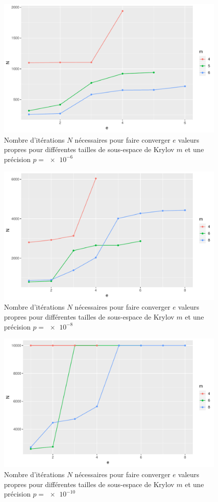 \documentclass[11pt,a4paper]{article}
\begin{document}
		\begin{figure}
			\centering
			\includegraphics[width=0.8\linewidth, keepaspectratio]{plots/Nvse-m_p6.pdf}
			\caption{Nombre d'itérations $N$ nécessaires pour faire converger $e$ valeurs propres pour différentes tailles de sous-espace de Krylov $m$ et une précision $p=\SI{e-6}{}$ \label{fig:Nvse-m_p6}}
		\end{figure}

		\begin{figure}
			\centering
			\includegraphics[width=0.8\linewidth, keepaspectratio]{plots/Nvse-m_p8.pdf}
			\caption{Nombre d'itérations $N$ nécessaires pour faire converger $e$ valeurs propres pour différentes tailles de sous-espace de Krylov $m$ et une précision $p=\SI{e-8}{}$ \label{fig:Nvse-m_p8}}
		\end{figure}

		\begin{figure}
			\centering
			\includegraphics[width=0.8\linewidth, keepaspectratio]{plots/Nvse-m_p10.pdf}
			\caption{Nombre d'itérations $N$ nécessaires pour faire converger $e$ valeurs propres pour différentes tailles de sous-espace de Krylov $m$ et une précision $p=\SI{e-10}{}$ \label{fig:Nvse-m_p10}}
		\end{figure}
\end{document}
